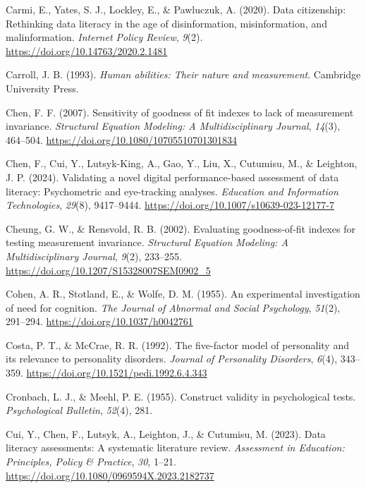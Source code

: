 \documentclass[
  12pt,
  a4paper,
  twoside]{article}
\newlength{\cslhangindent}
\newenvironment{CSLReferences}[2] %
 {\begin{list}{}{%
  \setlength{\itemindent}{0pt}
  \setlength{\leftmargin}{0pt}
  \setlength{\parsep}{0pt}
  \ifodd #1
   \setlength{\leftmargin}{\cslhangindent}
   \setlength{\itemindent}{-1\cslhangindent}
  \fi
  \setlength{\itemsep}{#2\baselineskip}}}
 {\end{list}}
\begin{document}
\begin{CSLReferences}{1}{0}
Carmi, E., Yates, S. J., Lockley, E., \& Pawluczuk, A. (2020). Data citizenship: Rethinking data literacy in the age of disinformation, misinformation, and malinformation. \emph{Internet Policy Review}, \emph{9}(2). \url{https://doi.org/10.14763/2020.2.1481}

Carroll, J. B. (1993). \emph{Human abilities: Their nature and measurement}. Cambridge University Press.

Chen, F. F. (2007). Sensitivity of goodness of fit indexes to lack of measurement invariance. \emph{Structural Equation Modeling: A Multidisciplinary Journal}, \emph{14}(3), 464--504. \url{https://doi.org/10.1080/10705510701301834}

Chen, F., Cui, Y., Lutsyk-King, A., Gao, Y., Liu, X., Cutumisu, M., \& Leighton, J. P. (2024). Validating a novel digital performance-based assessment of data literacy: Psychometric and eye-tracking analyses. \emph{Education and Information Technologies}, \emph{29}(8), 9417--9444. \url{https://doi.org/10.1007/s10639-023-12177-7}

Cheung, G. W., \& Rensvold, R. B. (2002). Evaluating goodness-of-fit indexes for testing measurement invariance. \emph{Structural Equation Modeling: A Multidisciplinary Journal}, \emph{9}(2), 233--255. \url{https://doi.org/10.1207/S15328007SEM0902_5}

Cohen, A. R., Stotland, E., \& Wolfe, D. M. (1955). An experimental investigation of need for cognition. \emph{The Journal of Abnormal and Social Psychology}, \emph{51}(2), 291--294. \url{https://doi.org/10.1037/h0042761}

Costa, P. T., \& McCrae, R. R. (1992). The five-factor model of personality and its relevance to personality disorders. \emph{Journal of Personality Disorders}, \emph{6}(4), 343--359. \url{https://doi.org/10.1521/pedi.1992.6.4.343}

Cronbach, L. J., \& Meehl, P. E. (1955). Construct validity in psychological tests. \emph{Psychological Bulletin}, \emph{52}(4), 281.

Cui, Y., Chen, F., Lutsyk, A., Leighton, J., \& Cutumisu, M. (2023). Data literacy assessments: A systematic literature review. \emph{Assessment in Education: Principles, Policy \& Practice}, \emph{30}, 1--21. \url{https://doi.org/10.1080/0969594X.2023.2182737}


\end{CSLReferences}
\end{document}
